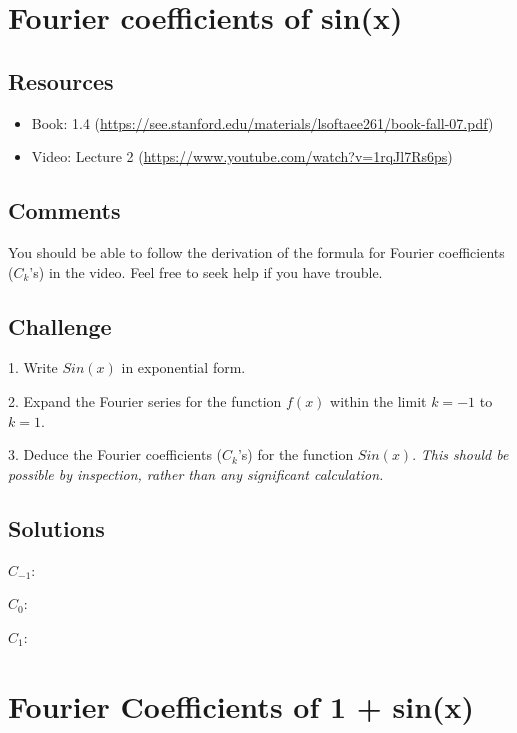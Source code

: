 \newpage

\section{Fourier coefficients of sin(x)}
\label{sec:fcsinx}

\subsection*{Resources}
\begin{itemize}
    \item Book: 1.4 (\url{https://see.stanford.edu/materials/lsoftaee261/book-fall-07.pdf})
    \item Video: Lecture 2 (\url{https://www.youtube.com/watch?v=1rqJl7Rs6ps})
\end{itemize}

\subsection*{Comments}
You should be able to follow the derivation of the formula for Fourier coefficients ($C_k$'s) in the video. Feel free to seek help if you have trouble.

\subsection*{Challenge}
1. Write $Sin(x)$ in exponential form.

2. Expand the Fourier series for the function $f(x)$ within the limit $k=-1$ to $k=1$. %

3. Deduce the Fourier coefficients ($C_k$'s) for the function $Sin(x)$. \emph{This should be possible by inspection, rather than any significant calculation.} %

\subsection*{Solutions}
$C_{-1}$: 

$C_{0}$: 

$C_{1}$: 




\newpage

\section{Fourier Coefficients of 1 + sin(x)}
\label{sec:fcsinxp1}

